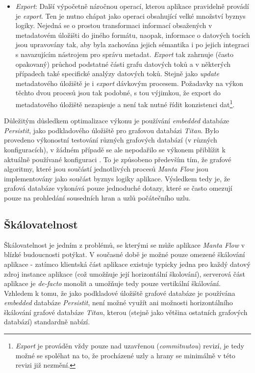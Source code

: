 \begin{itemize}
	\item{\textit{Export}}: Další výpočetně náročnou operací, kterou aplikace pravidelně provádí je \textit{export}. Ten je nutno chápat jako operaci obsahující velké množství byznys logiky. Nejedná se o prostou transformaci informací obsažených v metadatovém úložišti do jiného formátu, naopak, informace o datových tocích jsou upravovány tak, aby byla zachována jejich sémantika i po jejich integraci s navazujícím nástrojem pro správu metadat. \textit{Export} tak zahrnuje (často opakovaný) průchod podstatné části grafu datových toků a v některých případech také specifické analýzy datových toků. Stejně jako \textit{update} metadatového úložiště je i \textit{export} dávkovým procesem. Požadavky na výkon těchto dvou procesů jsou tak podobné, s tou výjimkou, že export do metadatového úložiště nezapisuje a není tak nutné řídit konzistenci dat\footnote{\textit{Export} je prováděn vždy pouze nad uzavřenou (\textit{commitnutou}) revizí, je tedy možné se spoléhat na to, že procházené uzly a hrany se minimálně v této revizi již nezmění.}.

\end{itemize}

Důležitým důsledkem optimalizace výkonu je používání \textit{embedded} databáze \textit{Persistit}, jako podkladového úložiště pro grafovou databázi \textit{Titan}. Bylo provedeno výkonostní testování různých grafových databází (v různých konfiguracích), v žádném případě se ale nepodařilo se výkonem přiblížit k aktuálně používané konfiguraci \cite{Kovar18}. To je způsobeno především tím, že grafové algoritmy, které jsou součástí jednotlivých procesů \textit{Manta Flow} jsou implementovány jako součást byznys logiky aplikace. Výsledkem tedy je, že grafová databáze vykonává pouze jednoduché dotazy, které se často omezují pouze na prohledání sousedních hran a uzlů počátečního uzlu.

\subsection{Škálovatelnost}
\label{sec:ana_scaling}
Škálovatelnost je jedním z problémů, se kterými se může aplikace \textit{Manta Flow} v blízké budoucnosti potýkat. V současné době je možné pouze omezené škálování aplikace - zatímco klientská část aplikace existuje typicky jedna pro každý datový zdroj instance aplikace (což umožňuje její horizontální školování), serverová část aplikace je \textit{de-facto} monolit a umožňuje tedy pouze vertikální škálování. Vzhledem k tomu, že jako podkladové úložiště grafové databáze je používána \textit{embedded} databáze \textit{Persistit}, není možné využít ani možnosti horizontálního škálování grafové databáze \textit{Titan}, kterou (stejně jako většina ostatních grafových databází) standardně nabízí.

